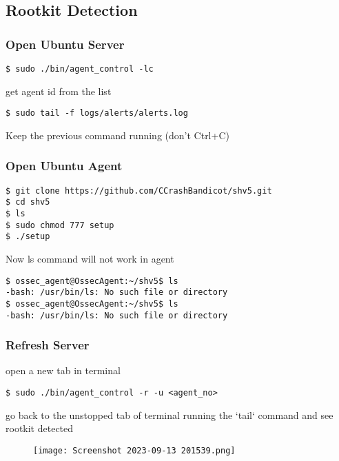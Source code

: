 \documentclass{article}
\begin{document}
\vspace{1cm}

\subsection{Rootkit Detection}
\subsubsection{Open Ubuntu Server}
\begin{verbatim}
$ sudo ./bin/agent_control -lc
\end{verbatim}
get agent id from the list
\begin{verbatim}
$ sudo tail -f logs/alerts/alerts.log
\end{verbatim}
Keep the previous command running (don’t Ctrl+C)
\subsubsection{Open Ubuntu Agent}

\begin{verbatim}
$ git clone https://github.com/CCrashBandicot/shv5.git
$ cd shv5
$ ls
$ sudo chmod 777 setup
$ ./setup
\end{verbatim}

Now ls command will not work in agent
\begin{verbatim}
$ ossec_agent@OssecAgent:~/shv5$ ls
-bash: /usr/bin/ls: No such file or directory
$ ossec_agent@OssecAgent:~/shv5$ ls
-bash: /usr/bin/ls: No such file or directory
\end{verbatim}

\subsubsection{Refresh Server}
open a new tab in terminal
\begin{verbatim}
$ sudo ./bin/agent_control -r -u <agent_no>
\end{verbatim}
go back to the unstopped tab of terminal running the `tail` command and see rootkit detected
\begin{figure}[hbt!]
    \centering
    \texttt{[image: Screenshot 2023-09-13 201539.png]}
\end{figure}




















% 
\end{document}
